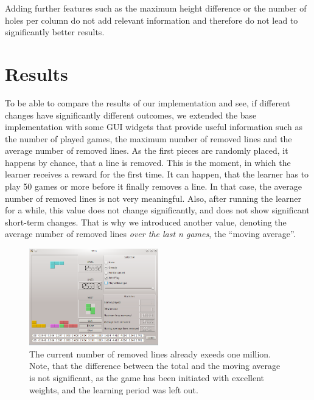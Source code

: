 \documentclass{ml}
\begin{document}
Adding further features such as the maximum height difference or the number of holes per column do not add relevant information and therefore do not lead to significantly better results. 





\section{Results}
\label{results}

To be able to compare the results of our implementation and see, if different changes have significantly different outcomes, we extended the base implementation with some GUI widgets that provide useful information such as the number of played games, the maximum number of removed lines and the average number of removed lines. As the first pieces are randomly placed, it happens by chance, that a line is removed. This is the moment, in which the learner receives a reward for the first time. It can happen, that the learner has to play 50 games or more before it finally removes a line. In that case, the average number of removed lines is not very meaningful. Also, after running the learner for a while, this value does not change significantly, and does not show significant short-term changes. That is why we introduced another value, denoting the average number of removed lines \textit{over the last n games}, the ``moving average''.

\begin{figure}
  \vspace{-5pt}
  \begin{center}
    \includegraphics[width=0.5\textwidth]{img/three.png}
  \end{center}
  \vspace{-5pt}
  \caption{\small{The current number of removed lines already exeeds one million. Note, that the difference between the total and the moving average is not significant, as the game has been initiated with excellent weights, and the learning period was left out.}}
  \label{three}
  \vspace{-5pt}
\end{figure}
\end{document}
